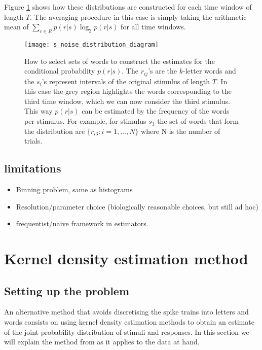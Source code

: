 \documentclass[10pt,a4paper]{book}
\begin{document}
Figure \ref{fig:s_noise_calculation} shows how these distributions are constructed for each time window of length $T$. The averaging procedure in this case is simply taking the arithmetic mean of $\sum_{r \in R} p(r|s)\log_2 p(r|s)$ for all time windows.

\begin{figure}
\begin{center}
\texttt{[image: s\_noise\_distribution\_diagram]}
\caption{How to select sets of words to construct the estimates for the conditional probability $p(r|s)$. The $r_{ij}$'s are the $k$-letter words and the $s_i$'s represent intervals of the original stimulus of length $T$. In this case the grey region highlights the words corresponding to the third time window, which we can now consider the third stimulus. This way $p(r|s)$ can be estimated by the frequency of the words per stimulus. For example, for stimulus $s_3$ the set of words that form the distribution are $\{r_{i3}: i=1,\dots, N\}$ where N is the number of trials.}
\label{fig:s_noise_calculation}
\end{center}
\end{figure}

\subsection{limitations}
\begin{itemize}
\item Binning problem, same as histograms
\item Resolution/parameter choice (biologically reasonable choices, but still ad hoc)
\item frequentist/naive framework in estimators.
\end{itemize}

\section{Kernel density estimation method}
\subsection{Setting up the problem}

An alternative method that avoids discretising the spike trains into letters and words consists on using kernel density estimation methods to obtain an estimate of the joint probability distribution of stimuli and responses. In this section we will explain the method from \cite{Houghton13} as it applies to the data at hand.
\end{document}
